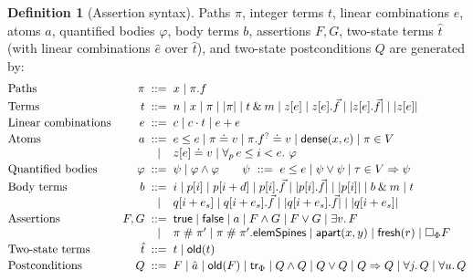 \documentclass[10pt,a4paper]{article}
\theoremstyle{definition}
\newtheorem{definition}[theorem]{Definition}
\theoremstyle{remark}
\newcommand{\bx}[1]{\Box_{#1}}
\newcommand{\sep}{\mathrel{\#}}
\newcommand{\kw}[1]{\mathsf{#1}}
\newcommand{\fresh}{\kw{fresh}}
\newcommand{\old}{\kw{old}}
\newcommand{\dense}{\kw{dense}}
\newcommand{\apart}{\kw{apart}}
\newcommand{\len}[1]{|#1|}
\begin{document}
\begin{definition}[Assertion syntax]\label{def:assert-syntax}
Paths $\pi$, integer terms $t$, linear combinations $e$, atoms $a$,
quantified bodies $\varphi$, body terms $b$, assertions $F,G$, two-state
terms $\hat t$ (with linear combinations $\hat e$ over $\hat t$), and
two-state postconditions $Q$ are generated by:
{\small\begin{displaymath}
\begin{array}{@{}l@{\quad}r@{\;\;}c@{\;\;}l@{}}
\text{Paths} & \pi &::=& x \mid \pi.f\\[2pt]
\text{Terms} & t &::=& n \mid x \mid \pi \mid \len\pi \mid t\mathbin{\&}m \mid z[e] \mid z[e].\vec f \mid \len{z[e].\vec f} \mid \len{z[e]}\\[2pt]
\text{Linear combinations} & e &::=& c \mid c\cdot t \mid e+e\\[2pt]
\text{Atoms} & a &::=& e\le e \mid \pi\doteq v \mid \pi.f^{?}\doteq v \mid \dense(x,e) \mid \pi\in V\\
 & & \mid & z[e]\doteq v \mid \forall_{p}\, e\le i<e.\ \varphi\\[2pt]
\text{Quantified bodies} & \varphi &::=& \psi \mid \varphi\wedge\varphi\qquad\psi\ ::=\ e\le e \mid \psi\vee\psi \mid \tau\in V\Rightarrow\psi\\[2pt]
\text{Body terms} & b &::=& i \mid p[i] \mid p[i+d] \mid p[i].\vec f \mid \len{p[i].\vec f} \mid \len{p[i]} \mid b\mathbin{\&}m \mid t\\
 & & \mid & q[i+e_s] \mid q[i+e_s].\vec f \mid \len{q[i+e_s].\vec f} \mid \len{q[i+e_s]}\\[2pt]
\text{Assertions} & F,G &::=& \kw{true} \mid \kw{false} \mid a \mid F\wedge G \mid F\vee G \mid \exists v.\,F\\
 & & \mid & \pi\sep\pi' \mid \pi\sep\pi'.\kw{elemSpines} \mid \apart(x,y) \mid \fresh(r) \mid \bx{\Phi}F\\[2pt]
\text{Two-state terms} & \hat t &::=& t \mid \old(t)\\[2pt]
\text{Postconditions} & Q &::=& F \mid \hat a \mid \old(F) \mid \kw{tr}_{\Phi} \mid Q\wedge Q \mid Q\vee Q \mid Q\Rightarrow Q \mid \forall j.\,Q \mid \forall u.\,Q
\end{array}
\end{displaymath}}
\end{definition}
\end{document}
